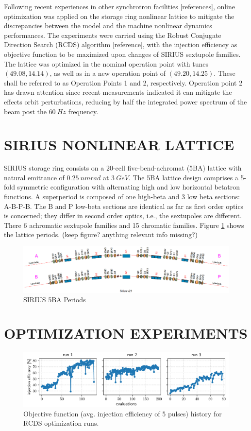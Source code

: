 \documentclass[a4paper,
               keeplastbox,   %
               ]{jacow}
\begin{document}
Following recent experiences in other synchrotron facilities [references], online optimization was applied on the storage ring nonlinear lattice to mitigate the discrepancies between the model and the machine nonlinear dynamics performances. The experiments were carried using the Robust Conjugate Direction Search (RCDS) algorithm [reference], with the injection efficiency as objective function to be maximized upon changes of SIRIUS sextupole families. The lattice was optimized in the nominal operation point with tunes $(49.08, 14.14)$, as well as in a new operation point of $(49.20, 14.25)$.  These shall be referred to as Operation Points 1 and 2, respectively. Operation point 2 has drawn attention since recent measurements indicated it can mitigate the effects orbit perturbations, reducing by half the integrated power spectrum of the beam post the $60~\unit{Hz}$ frequency.   

\section{SIRIUS NONLINEAR LATTICE}
 SIRIUS storage ring consists on a 20-cell five-bend-achromat (5BA) lattice with natural emittance of $0.25~\si{nm rad}$ at $3~\unit{GeV}$. The 5BA lattice design comprises a 5-fold symmetric configuration with alternating high and low horizontal betatron functions. A superperiod is composed of one high-beta and 3 low beta sections: A-B-P-B. The B and P low-beta sections are identical as far as first order optics is concerned; they differ in second order optics, i.e., the sextupoles are different. There 6 achromatic sextupole families and 15 chromatic families. Figure \ref{fig:sirius} shows the lattice periods. (keep figure? anything relevant info missing?)
  \begin{figure}[!h]
     \centering
     \includegraphics[width=\columnwidth]{SI_superperiod.png}
     \caption{SIRIUS 5BA Periods}
     \label{fig:sirius}
 \end{figure}
\section{OPTIMIZATION EXPERIMENTS}
\begin{figure}[!h]
    \centering
    \includegraphics*[width=\textwidth]{oldtunes_runs123.pdf}
    \caption{Objective function (avg. injection efficiency of 5 pulses) history for RCDS optimization runs.}
    \label{fig:oldtunes_runs123}
\end{figure}
\end{document}
